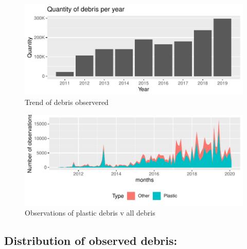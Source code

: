 \documentclass[10pt]{article}\usepackage[]{graphicx}\usepackage[]{color}
\newenvironment{knitrout}{}{} %
\begin{document}
\begin{figure}[H] %
\begin{center}
\begin{knitrout}\small
{}\color{fgcolor}
\includegraphics[width=1\linewidth]{figure/unnamed-chunk-10-1} 

\end{knitrout}
\caption {Trend of debris observered}
\label{figD}
\end {center}
\end {figure}


\begin{figure}[H] %
\begin{center}
\begin{knitrout}\small
{}\color{fgcolor}
\includegraphics[width=1\linewidth]{figure/unnamed-chunk-11-1} 

\end{knitrout}
\caption {Observations of plastic debris v all debris}
\label{figF}
\end {center}
\end {figure}


\subsection {Distribution of observed debris:}
\end{document}
